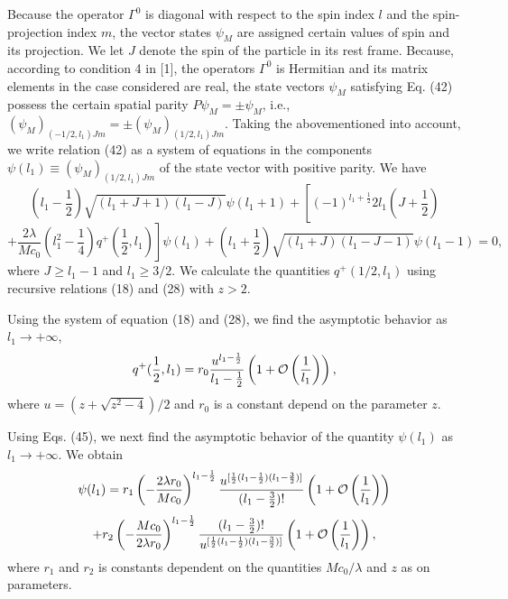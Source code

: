 \documentclass[a4paper,12pt]{article}
\begin{document}
Because the operator $\Gamma^{0}$ is diagonal with respect to the spin index 
$l$ and the spin-projection index $m$, the vector states $\psi_{M}$ are 
assigned certain values of spin and its projection. We let $J$ denote the spin 
of the particle in its rest frame. Because, according to condition 4 in [1],
the operators $\Gamma^{0}$ is Hermitian and its matrix elements in the case
considered are real, the state vectors $\psi_{M}$ satisfying Eq. (42) possess
the certain spatial parity $P\psi_{M}=\pm \psi_{M}$, i.e.,  
$(\psi_{M})_{(-1/2,l_{1})Jm} = \pm (\psi_{M})_{(1/2,l_{1})Jm}$. Taking the
abovementioned into account, we write relation (42) as a system of equations in
the components $\psi (l_{1}) \equiv (\psi_{M})_{(1/2,l_{1})Jm}$ of the state
vector with positive parity. We have
$$\left( l_{1}-\frac{1}{2}\right) \sqrt{(l_{1}+J+1)(l_{1}-J)} 
\psi (l_{1}+1) + \left[ (-1)^{l_{1}+\frac{1}{2}} 2 l_{1}\left( J+\frac{1}{2}
\right) \right.$$
\begin{equation}
\left. +\frac{2\lambda}{Mc_{0}} \left( l_{1}^{2}-\frac{1}{4}\right) 
q^{+}(\frac{1}{2},l_{1}) \right] \psi (l_{1}) + \left( l_{1}+
\frac{1}{2}\right) \sqrt{(l_{1}+J)(l_{1}-J-1)} \psi (l_{1}-1)=0,
\end{equation}
where $J \geq l_{1}-1$ and $l_{1} \geq 3/2$. We calculate the quantities
$q^{+}(1/2,l_{1})$ using recursive relations (18) and (28) with $z > 2$.

Using the system of equation (18) and (28), we find the asymptotic behavior as 
$l_{1} \rightarrow +\infty$, 
\begin{equation}
q^{+}(\frac{1}{2},l_{1}) = r_{0}\frac{u^{l_{1}-\frac{1}{2}}}{l_{1}-\frac{1}{2}}
\left( 1 + {\cal O}\left( \frac{1}{l_{1}}\right) \right),
\end{equation}
where $u=(z+ \sqrt{z^{2}-4})/2$ and $r_{0}$ is a constant depend on the
parameter $z$. 

Using Eqs. (45), we next find the asymptotic behavior of the quantity 
$\psi (l_{1})$ as $l_{1} \rightarrow +\infty$. We obtain
$$\psi (l_{1}) = r_{1}\left( -\frac{2\lambda r_{0}}{Mc_{0}}
\right)^{l_{1}-\frac{1}{2}} 
\frac{u^{[\frac{1}{2}(l_{1}-\frac{1}{2})(l_{1}-\frac{3}{2})]}}
{(l_{1}-\frac{3}{2})!} \left( 1 + 
{\cal O}\left( \frac{1}{l_{1}}\right) \right)$$
\begin{equation}
+ r_{2}\left( -\frac{Mc_{0}}{2\lambda r_{0}}
\right)^{l_{1}-\frac{1}{2}} \frac{(l_{1}-\frac{3}{2})!}
{u^{[\frac{1}{2}(l_{1}-\frac{1}{2})(l_{1}-\frac{3}{2})]}}\left( 1 + 
{\cal O}\left( \frac{1}{l_{1}}\right) \right),
\end{equation}
where $r_{1}$ and $r_{2}$ is constants dependent on the quantities 
$Mc_{0}/\lambda$ and $z$ as on parameters.
 
\end{document}

